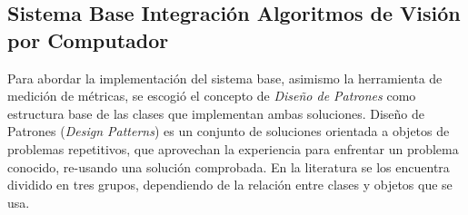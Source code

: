 \subsection{Sistema Base Integración Algoritmos de Visión por Computador}




Para abordar la implementación del sistema base, asimismo la herramienta de medición de métricas, se escogió el concepto de \textit{Diseño de Patrones}\cite{gamma_design_1995} como estructura base de las clases que implementan ambas soluciones. Diseño de Patrones (\textit{Design Patterns}\cite{gamma_design_1995}) es un conjunto de soluciones orientada a objetos de problemas repetitivos, que aprovechan la experiencia para enfrentar un problema conocido, re-usando una solución comprobada. En la literatura se los encuentra dividido en tres grupos, dependiendo de la relación entre clases y objetos que se usa. 

